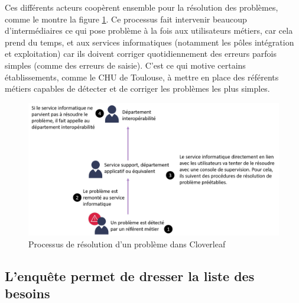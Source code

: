 			Ces différents acteurs coopèrent ensemble pour la résolution des problèmes,
			comme le montre la figure \ref{resolution_pbs}. Ce processus fait intervenir
			beaucoup d’intermédiaires ce qui pose problème à la fois aux utilisateurs métiers,
			car cela prend du temps, et aux services informatiques
			(notamment les pôles intégration et exploitation) car ils doivent corriger
			quotidiennement des erreurs parfois simples (comme des erreurs de saisie).
			C'est ce qui motive certains établissements, comme le CHU de
			Toulouse, à mettre en place des référents métiers capables de détecter et
			de corriger les problèmes les plus simples.
			\begin{figure}[H]
				\centering
				\includegraphics[width=15cm]{../img/user_1.png}
				\caption{\label{resolution_pbs} Processus de résolution d'un problème dans
				Cloverleaf}
			\end{figure}
			
		\subsection{L'enquête permet de dresser la liste des besoins}
